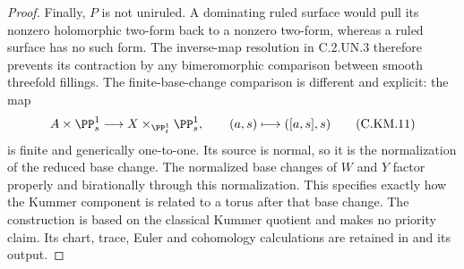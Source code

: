 \begin{proof}
Finally, $P$ is not uniruled. A dominating ruled surface
would pull its nonzero holomorphic two-form back to a
nonzero two-form, whereas a ruled surface has no such
form. The inverse-map resolution in C.2.UN.3 therefore
prevents its contraction by any bimeromorphic comparison
between smooth threefold fillings. The finite-base-change
comparison is different and explicit: the map
\[
 A\times\PP^1_s\longrightarrow
 X\times_{\PP^1_t}\PP^1_s,
         \qquad(a,s)\longmapsto([a,s],s)               \tag{C.KM.11}
\]
is finite and generically one-to-one. Its source is
normal, so it is the normalization of the reduced
base change. The normalized base changes of $W$ and
$Y$ factor properly and birationally through this
normalization. This specifies exactly how the Kummer
component is related to a torus after that base change.
The construction is based on the classical Kummer
quotient and makes no priority claim. Its chart,
trace, Euler and cohomology calculations are retained
in  and its output.
\end{proof}
